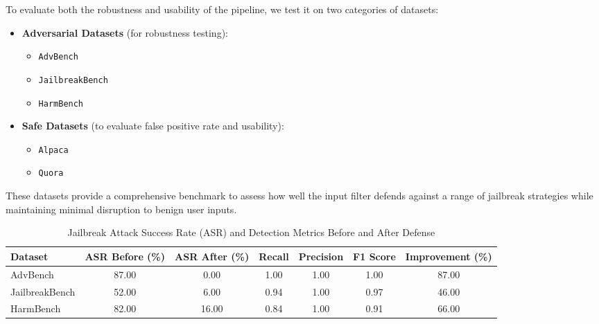 \documentclass[../main.tex]{subfiles}
\begin{document}
To evaluate both the robustness and usability of the pipeline, we test it on two categories of datasets:
\begin{itemize}
    \item \textbf{Adversarial Datasets} (for robustness testing):
    \begin{itemize}
        \item \texttt{AdvBench}
        \item \texttt{JailbreakBench}
        \item \texttt{HarmBench}
    \end{itemize}

    \item \textbf{Safe Datasets} (to evaluate false positive rate and usability):
    \begin{itemize}
        \item \texttt{Alpaca}
        \item \texttt{Quora}
    \end{itemize}
\end{itemize}

These datasets provide a comprehensive benchmark to assess how well the input filter defends against a range of jailbreak strategies while maintaining minimal disruption to benign user inputs.
\begin{table}[H]
\centering
\hspace*{-10pt} %
\small
\setlength{\tabcolsep}{4pt} %
\renewcommand{\arraystretch}{0.8} %
\caption{Jailbreak Attack Success Rate (ASR) and Detection Metrics Before and After Defense}
\label{tab:asr_detection}
\begin{tabular}{p{2.5cm}cccccc}
\toprule
\textbf{Dataset} & \textbf{ASR Before (\%)} & \textbf{ASR After (\%)} & \textbf{Recall} & \textbf{Precision} & \textbf{F1 Score} & \textbf{Improvement (\%)} \\
\midrule
AdvBench         & 87.00                    & 0.00                    & 1.00            & 1.00               & 1.00              & 87.00 \\
JailbreakBench   & 52.00                    & 6.00                    & 0.94            & 1.00               & 0.97              & 46.00 \\
HarmBench        & 82.00                    & 16.00                   & 0.84            & 1.00               & 0.91              & 66.00 \\
\bottomrule
\end{tabular}
\end{table}
\end{document}
